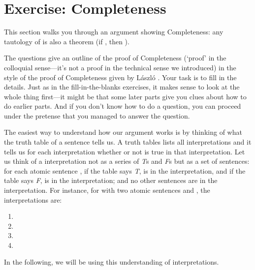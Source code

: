 \section{Exercise: Completeness}\label{sec:propCompleteness}
\newcommand{\setM}{\ensuremath{\mathcal{M}}}

This section walks you through an argument showing Completeness: any tautology 
of \lL{} is also a theorem (if , then ). 

The questions give an outline of the proof of Completeness (`proof' in the 
colloquial sense---it's not a proof in the technical sense we introduced) in the 
style of the proof of Completeness given by László \citet{Kalmar1935}. Your task 
is to fill in  the details.  Just as in the fill-in-the-blanks exercises, it 
makes sense to look at the whole thing first---it might be that some later parts 
give you clues about how to do earlier parts. And if you don't know how to do a 
question, you can proceed under the pretense that you managed to answer the 
question.


The easiest way to understand how our argument works is by thinking of what the 
truth table of a sentence  tells us. A truth tables lists all interpretations and it 
tells us for each interpretation whether or not  is true in that interpretation.  Let us 
think of a interpretation not as a series of \emph{T}s and   \emph{F}s but as a set of 
sentences: for each atomic sentence , if the table says \emph{T},  
is in the interpretation, and if the table says \emph{F},  is in the interpretation; 
and no other sentences are in the interpretation.  For instance, for \lL{} with two 
atomic sentences  and , the interpretations are:

\begin{enumerate}

 \item {}

 \item {}

 \item {}

 \item {}

\end{enumerate}

In the following, we will be using this understanding of interpretations.


